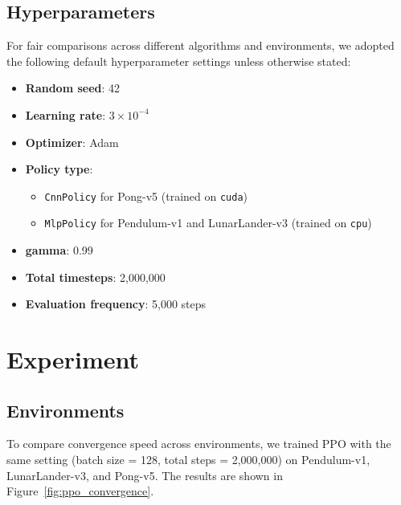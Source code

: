 \documentclass[10pt,twocolumn,letterpaper]{article}
\begin{document}
\subsection{Hyperparameters}
For fair comparisons across different algorithms and environments, we adopted the following default hyperparameter settings unless otherwise stated:

\begin{itemize}
    \item \textbf{Random seed}: 42
    \item \textbf{Learning rate}: $3 \times 10^{-4}$ 
    \item \textbf{Optimizer}: Adam 
    \item \textbf{Policy type}:
    \begin{itemize}
        \item \texttt{CnnPolicy} for Pong-v5 (trained on \texttt{cuda})
        \item \texttt{MlpPolicy} for Pendulum-v1 and LunarLander-v3 (trained on \texttt{cpu})
    \end{itemize}
    \item \textbf{gamma}: 0.99
    \item \textbf{Total timesteps}: 2,000,000
    \item \textbf{Evaluation frequency}: 5,000 steps
\end{itemize}

\section{Experiment}
\label{sec:experiment}

\subsection{Environments}
To compare convergence speed across environments, we trained PPO with the same setting (batch size = 128, total steps = 2,000,000) on Pendulum-v1, LunarLander-v3, and Pong-v5. The results are shown in Figure~\ref{fig:ppo_convergence}.
\end{document}
